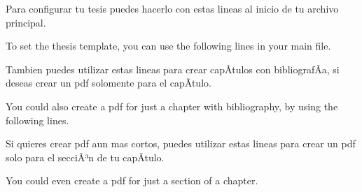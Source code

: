 Para configurar tu tesis puedes hacerlo con estas lineas al inicio de tu
archivo principal.

To set the thesis template, you can use the following lines in your main
file.

\begin{Shaded}
\begin{Highlighting}[]

\NormalTok{)}

\end{Highlighting}
\end{Shaded}

Tambien puedes utilizar estas lineas para crear capÃ­tulos con
bibliografÃ­a, si deseas crear un pdf solomente para el capÃ­tulo.

You could also create a pdf for just a chapter with bibliography, by
using the following lines.

\begin{Shaded}
\begin{Highlighting}[]


\end{Highlighting}
\end{Shaded}

Si quieres crear pdf aun mas cortos, puedes utilizar estas lineas para
crear un pdf solo para el secciÃ³n de tu capÃ­tulo.

You could even create a pdf for just a section of a chapter.

\begin{Shaded}
\begin{Highlighting}[]


\end{Highlighting}
\end{Shaded}

